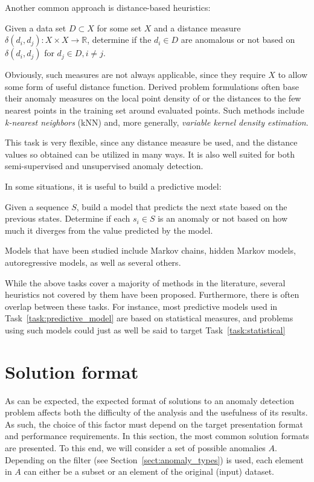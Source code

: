 Another common approach is distance-based heuristics:
\begin{task}
  Given a data set $D \subset X$ for some set $X$ and a distance measure $\delta(d_i, d_j): X \times X \rightarrow \mathbb{R}$, determine if the $d_i \in D$ are anomalous or not based on $\delta(d_i, d_j)$ for $d_j \in D, i \neq j$.
\end{task}
Obviously, such measures are not always applicable, since they require $X$ to allow some form of useful distance function. Derived problem formulations often base their anomaly measures on the local point density of or the distances to the few nearest points in the training set around evaluated points. Such methods include \emph{k-nearest neighbors} (kNN) and, more generally, \emph{variable kernel density estimation}.

This task is very flexible, since any distance measure be used, and the distance values so obtained can be utilized in many ways. It is also well suited for both semi-supervised and unsupervised anomaly detection.

In some situations, it is useful to build a predictive model:
\begin{task}
\label{task:predictive_model}
  Given a sequence $S$, build a model that predicts the next state based on the previous states. Determine if each $s_i \in S$ is an anomaly or not based on how much it diverges from the value predicted by the model.
\end{task}
Models that have been studied include Markov chains, hidden Markov models, autoregressive models, as well as several others.

While the above tasks cover a majority of methods in the literature, several heuristics not covered by them have been proposed. Furthermore, there is often overlap between these tasks. For instance, most predictive models used in Task~\ref{task:predictive_model} are based on statistical measures, and problems using such models could just as well be said to target Task~\ref{task:statistical}

\section{Solution format}
\label{sect:output_format}

As can be expected, the expected format of solutions to an anomaly detection problem affects both the difficulty of the analysis and the usefulness of its results. As such, the choice of this factor must depend on the target presentation format and performance requirements. In this section, the most common solution formats are presented. To this end, we will consider a set of possible anomalies $A$. Depending on the filter (see Section~\ref{sect:anomaly_types}) is used, each element in $A$ can either be a subset or an element of the original (input) dataset.

